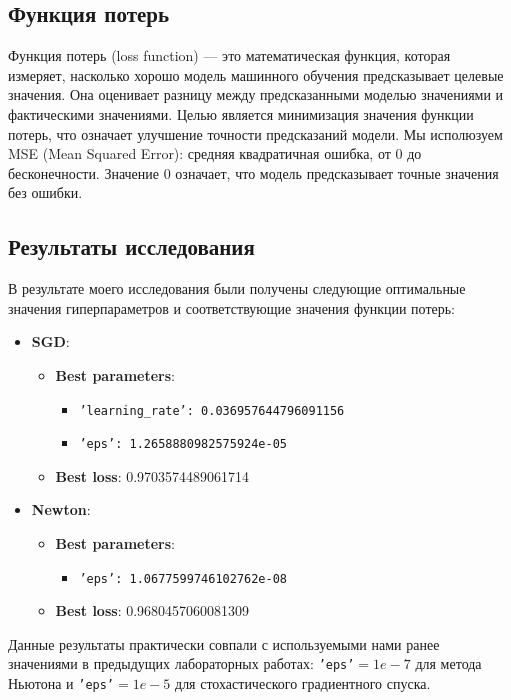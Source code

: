 \documentclass{article}
\begin{document}
\subsection*{Функция потерь}
Функция потерь (loss function) — это математическая функция, которая измеряет, насколько хорошо модель машинного обучения предсказывает целевые значения. Она оценивает разницу между предсказанными моделью значениями и фактическими значениями. Целью является минимизация значения функции потерь, что означает улучшение точности предсказаний модели. Мы исполюзуем MSE (Mean Squared Error): средняя квадратичная ошибка, от 0 до бесконечности. Значение 0 означает, что модель предсказывает точные значения без ошибки.

\subsection*{Результаты исследования}
В результате моего исследования были получены следующие оптимальные значения гиперпараметров и соответствующие значения функции потерь:

\begin{itemize}
    \item \textbf{SGD}:
    \begin{itemize}
        \item \textbf{Best parameters}: 
        \begin{itemize}
            \item \texttt{'learning\_rate': 0.036957644796091156}
            \item \texttt{'eps': 1.2658880982575924e-05}
        \end{itemize}
        \item \textbf{Best loss}: 0.9703574489061714
    \end{itemize}
    \item \textbf{Newton}:
    \begin{itemize}
        \item \textbf{Best parameters}:
        \begin{itemize}
            \item \texttt{'eps': 1.0677599746102762e-08}
        \end{itemize}
        \item \textbf{Best loss}: 0.9680457060081309
    \end{itemize}
\end{itemize}

\noindent Данные результаты практически совпали с используемыми нами ранее значениями в предыдущих лабораторных работах: \texttt{'eps'}$=1e-7$ для метода Ньютона и \texttt{'eps'}$=1e-5$ для стохастического градиентного спуска.
\end{document}
